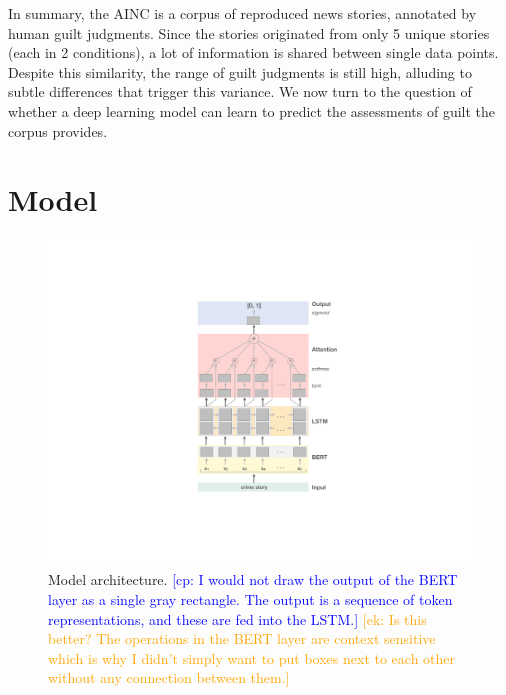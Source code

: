 \documentclass[11pt,a4paper]{article}
\newcommand{\ek}[1]{\textcolor{Orange}{[ek: #1]}}
\newcommand{\cp}[1]{\textcolor{Blue}{[cp: #1]}}
\begin{document}
In summary, the AINC is a corpus of reproduced news stories, annotated by human guilt judgments. Since the stories originated from only 5 unique stories (each in 2 conditions), a lot of information is shared between single data points.  Despite this similarity, the range of guilt judgments is still high, alluding to subtle differences that trigger this variance. We now turn to the question of whether a deep learning model can learn to predict the assessments of guilt the corpus provides.



\section{Model}\label{model-architecture}

\begin{figure}[th]
  \includegraphics[width=1\linewidth]{graphs/model.pdf}
  \caption{Model architecture. \cp{I would not draw the output
      of the BERT layer as a single gray rectangle. The
      output is a sequence of token representations,
      and these are fed into the LSTM.} \ek{Is this better? The operations in the BERT layer are context sensitive which is why I didn't simply want to put boxes next to each other without any connection between them.}
    }
  \label{fig:model}
\end{figure}
\end{document}
